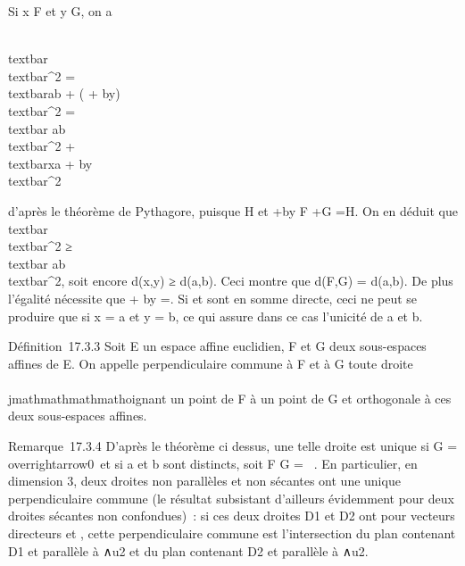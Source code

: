 Si x \in F et y \in G, on a

\\textbar{}\overrightarrowxy\\textbar{}^2
=\\textbar{}\overrightarrow ab +
(\overrightarrowxa
+\overrightarrow
by)\\textbar{}^2
=\\textbar{}\overrightarrow
ab\\textbar{}^2
+\\textbar{}\overrightarrow xa
+\overrightarrow
by\\textbar{}^2

d'après le théorème de Pythagore, puisque
\overrightarrowab \bot\overrightarrow
H et \overrightarrowxa
+\overrightarrow by \in\overrightarrow
F +\overrightarrow G
=\overrightarrow H. On en déduit que
\\textbar{}\overrightarrowxy\\textbar{}^2
≥\\textbar{}\overrightarrow
ab\\textbar{}^2, soit encore d(x,y) ≥ d(a,b).
Ceci montre que d(F,G) = d(a,b). De plus l'égalité nécessite que
\overrightarrowxa +\overrightarrow
by =. Si
\overrightarrowF et
\overrightarrowG sont en somme directe, ceci ne peut
se produire que si x = a et y = b, ce qui assure dans ce cas l'unicité
de a et b.

Définition~17.3.3 Soit E un espace affine euclidien, F et G deux
sous-espaces affines de E. On appelle perpendiculaire commune à F et à G
toute droite \\\\jmathmathmathmathoignant un point de F à un point de G et orthogonale à ces
deux sous-espaces affines.

Remarque~17.3.4 D'après le théorème ci dessus, une telle droite est
unique si \overrightarrowF
\bigcap\overrightarrow G =
\\overrightarrow0\
et si a et b sont distincts, soit F \bigcap G = \varnothing~. En particulier, en
dimension 3, deux droites non parallèles et non sécantes ont une unique
perpendiculaire commune (le résultat subsistant d'ailleurs évidemment
pour deux droites sécantes non confondues)~: si ces deux droites
D1 et D2 ont pour vecteurs directeurs
 et
, cette perpendiculaire
commune est l'intersection du plan contenant D1 et parallèle à
\overrightarrowu1
∧\overrightarrow u2 et du plan contenant
D2 et parallèle à
∧\overrightarrow u2.

